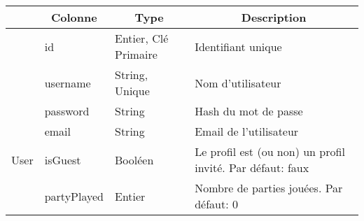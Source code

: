 \begin{longtable}[c]{@{}|p{}|p{}|p{}|p{}|@{}}
	\rowcolor{ccPurple} 
	\multicolumn{1}{|c|}{Table} & \multicolumn{1}{c|}{Colonne} & \multicolumn{1}{c|}{Type}                                        & \multicolumn{1}{c|}{Description}                                 \\
	\endhead
														& id                                                   & Entier, Clé Primaire                                                                     & Identifiant unique                                                                       \\* \cline{2-4} 
														& username                                             & String, Unique                                                                           & Nom d’utilisateur                                                                        \\* \cline{2-4} 
														& password                                             & String                                                                                   & Hash du mot de passe                                                                     \\* \cline{2-4} 
														& email                                                & String                                                                                   & Email de l’utilisateur                                                                   \\* \cline{2-4} 
	\multirow{-5}{*}{User}								& isGuest                                              & Booléen                                                                                  & Le profil est (ou non) un profil invité. Par défaut: faux                                \\* \cline{2-4} 
							                            & partyPlayed                                          & Entier                                                                                   & Nombre de parties jouées. Par défaut: 0                                                  \\* \hline

\end{longtable}
